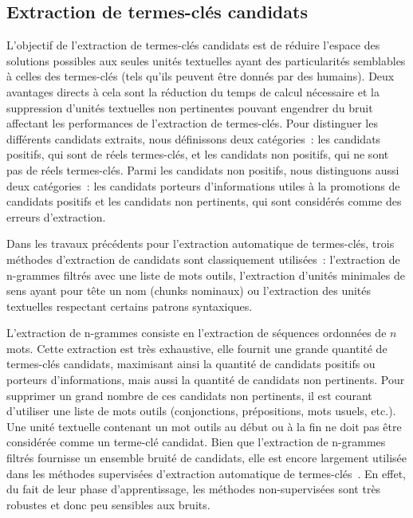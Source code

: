   \subsection{Extraction de termes-clés candidats}
  \label{subsec:extraction_de_termes_cles_candidats}
    L'objectif de l'extraction de termes-clés candidats est de réduire l'espace
    des solutions possibles aux seules unités textuelles ayant des
    particularités semblables à celles des termes-clés (tels qu'ils peuvent être
    donnés par des humains). Deux avantages directs à cela sont la réduction du
    temps de calcul nécessaire et la suppression d'unités textuelles non
    pertinentes pouvant engendrer du bruit affectant les performances de
    l'extraction de termes-clés. Pour distinguer les différents candidats
    extraits, nous définissons deux catégories~: les candidats positifs, qui
    sont de réels termes-clés, et les candidats non positifs, qui ne sont pas de
    réels termes-clés. Parmi les candidats non positifs, nous distinguons aussi
    deux catégories~: les candidats porteurs d'informations utiles à la
    promotions de candidats positifs et les candidats non pertinents, qui sont
    considérés comme des erreurs d'extraction.

    Dans les travaux précédents pour l'extraction automatique de termes-clés,
    trois méthodes d'extraction de candidats sont classiquement utilisées~:
    l'extraction de n-grammes filtrés avec une liste de mots outils,
    l'extraction d'unités minimales de sens ayant pour tête un nom (chunks
    nominaux) ou l'extraction des unités textuelles respectant certains patrons
    syntaxiques.

    L'extraction de n-grammes consiste en l'extraction de séquences ordonnées de
    $n$ mots. Cette extraction est très exhaustive, elle fournit une grande
    quantité de termes-clés candidats, maximisant ainsi la quantité de candidats
    positifs ou porteurs d'informations, mais aussi la quantité de candidats non
    pertinents. Pour supprimer un grand nombre de ces candidats non pertinents,
    il est courant d'utiliser une liste de mots outils (conjonctions,
    prépositions, mots usuels, etc.). Une unité textuelle contenant un mot
    outils au début ou à la fin ne doit pas être considérée comme un terme-clé
    candidat. Bien que l'extraction de n-grammes filtrés fournisse un ensemble
    bruité de candidats, elle est encore largement utilisée dans les méthodes
    supervisées d'extraction automatique de
    termes-clés~\cite{witten1999kea,turney1999learningalgorithms,hulth2003keywordextraction}.
    En effet, du fait de leur phase d'apprentissage, les méthodes
    non-supervisées sont très robustes et donc peu sensibles aux bruits.


